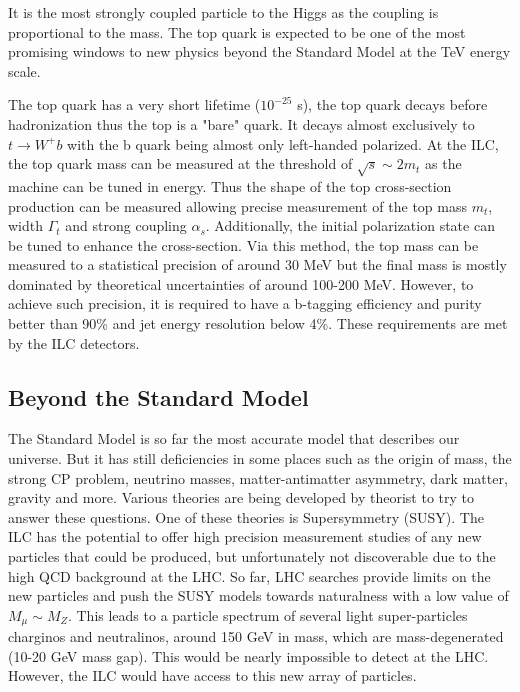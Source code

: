 It is the most strongly coupled particle to the Higgs as the coupling is proportional to the mass. The top quark is expected to be one of the most promising windows to new physics beyond the Standard Model at the TeV energy scale.

The top quark has a very short lifetime ($10^{-25}$ s), the top quark decays before hadronization thus the top is a "bare" quark. It decays almost exclusively to $t \rightarrow W^+b$ with the b quark being almost only left-handed polarized. At the ILC, the top quark mass can be measured at the threshold of $\sqrt{s} \sim 2 m_t$ as the machine can be tuned in energy. Thus the shape of the top cross-section production can be measured allowing precise measurement of the top mass $m_t$, width $\Gamma_t$ and strong coupling $\alpha_s$. Additionally, the initial polarization state can be tuned to enhance the cross-section. Via this method, the top mass can be measured to a statistical precision of around 30 MeV but the final mass is mostly dominated by theoretical uncertainties of around 100-200 MeV. However, to achieve such precision, it is required to have a b-tagging efficiency and purity better than 90\% and jet energy resolution below 4\%. These requirements are met by the ILC detectors.

\subsection{Beyond the Standard Model}

The Standard Model is so far the most accurate model that describes our universe. But it has still deficiencies in some places such as the origin of mass, the strong CP problem, neutrino masses, matter-antimatter asymmetry, dark matter, gravity and more. Various theories are being developed by theorist to try to answer these questions. One of these theories is Supersymmetry (SUSY). The ILC has the potential to offer high precision measurement studies of any new particles that could be produced, but unfortunately not discoverable due to the high QCD background at the LHC. So far, LHC searches provide limits on the new particles and push the SUSY models towards naturalness with a low value of $M_{\mu} \sim M_Z$. This leads to a particle spectrum of several light super-particles charginos and neutralinos, around 150 GeV in mass, which are mass-degenerated (10-20 GeV mass gap). This would be nearly impossible to detect at the LHC. However, the ILC would have access to this new array of particles.

